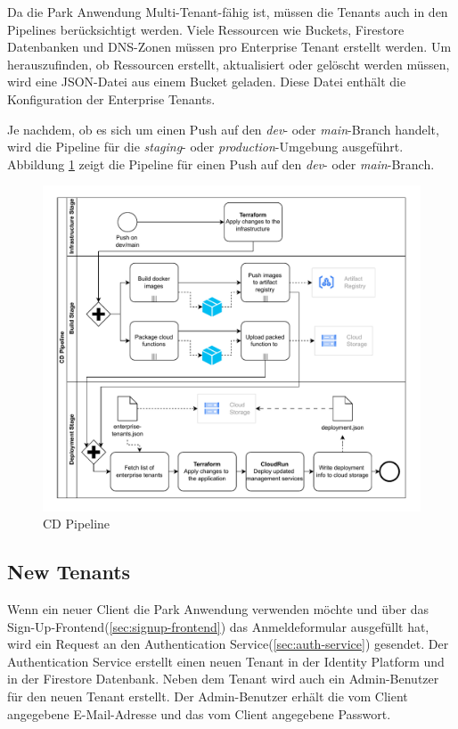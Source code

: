 Da die Park Anwendung Multi-Tenant-fähig ist, müssen die Tenants auch in den Pipelines berücksichtigt werden.
Viele Ressourcen wie Buckets, Firestore Datenbanken und DNS-Zonen müssen pro Enterprise Tenant erstellt werden.
Um herauszufinden, ob Ressourcen erstellt, aktualisiert oder gelöscht werden müssen, wird eine JSON-Datei 
aus einem Bucket geladen. Diese Datei enthält die Konfiguration der Enterprise Tenants.

Je nachdem, ob es sich um einen Push auf den \textit{dev}- oder \textit{main}-Branch handelt, wird die Pipeline
für die \textit{staging}- oder \textit{production}-Umgebung ausgeführt.
Abbildung \ref{fig:cd-pipeline} zeigt die Pipeline für einen Push auf den \textit{dev}- oder \textit{main}-Branch.

\begin{figure}[ht]
  \centering
  \includegraphics[width=\textwidth]{resources/cd-pipeline.pdf}
  \caption{CD Pipeline}
  \label{fig:cd-pipeline}
\end{figure}


\subsection{New Tenants}

Wenn ein neuer Client die Park Anwendung verwenden möchte und über das Sign-Up-Frontend(\ref{sec:signup-frontend})
das Anmeldeformular ausgefüllt hat, wird ein Request an den Authentication Service(\ref{sec:auth-service}) gesendet.
Der Authentication Service erstellt einen neuen Tenant in der Identity Platform und in der Firestore Datenbank.
Neben dem Tenant wird auch ein Admin-Benutzer für den neuen Tenant erstellt. Der Admin-Benutzer 
erhält die vom Client angegebene E-Mail-Adresse und das vom Client angegebene Passwort.

